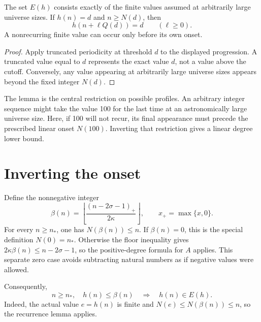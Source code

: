 \begin{lemma}\label{tx:lem:recurrence}
The set $E(h)$ consists exactly of the finite values assumed at
arbitrarily large universe sizes. If $h(n)=d$ and $n\ge N(d)$, then
\[
                          h(n+\ell Q(d))=d\qquad(\ell\ge0).
\]
A nonrecurring finite value can occur only before its own onset.
\end{lemma}
\begin{proof}
Apply truncated periodicity at threshold $d$ to the displayed
progression. A truncated value equal to $d$ represents the exact value
$d$, not a value above the cutoff. Conversely, any value appearing at
arbitrarily large universe sizes appears beyond the fixed integer $N(d)$.
\end{proof}

The lemma is the central restriction on possible profiles. An arbitrary
integer sequence might take the value 100 for the last time at an
astronomically large universe size. Here, if 100 will not recur, its final
appearance must precede the prescribed linear onset $N(100)$.
Inverting that restriction gives a linear degree lower bound.

\section{Inverting the onset}
Define the nonnegative integer
\begin{equation}\label{tx:eq:inverse-onset}
 \beta(n)=\left\lfloor\frac{(n-2\sigma-1)_+}{2\kappa}\right\rfloor,
                         \qquad x_+=\max\{x,0\}.
\end{equation}
For every $n\ge n_*$, one has $N(\beta(n))\le n$. If $\beta(n)=0$,
this is the special definition $N(0)=n_*$. Otherwise the floor inequality
gives $2\kappa\beta(n)\le n-2\sigma-1$, so the positive-degree formula
for $A$ applies. This separate zero case avoids subtracting natural
numbers as if negative values were allowed.

Consequently,
\begin{equation}\label{tx:eq:low-value-recurs}
 n\ge n_*,\quad h(n)\le\beta(n)
                   \quad\Longrightarrow\quad h(n)\in E(h).
\end{equation}
Indeed, the actual value $e=h(n)$ is finite and
$N(e)\le N(\beta(n))\le n$, so the recurrence lemma applies.


